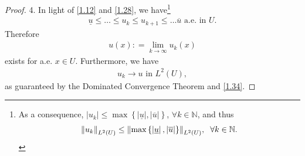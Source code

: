 \documentclass[11pt,a4paper,center,notitlepage]{article}
\numberwithin{equation}{section}
\begin{document}
\begin{proof}
4. In light of \eqref{1.12} and \eqref{1.28}, we have\footnote{As a consequence, $\left| {{u_k}} \right| \le \max \left\{ {\left| {\underline u } \right|,\left| {\overline u } \right|} \right\}$, $\forall k \in \mathbb{N}$, and thus
\begin{align}
{\left\| {{u_k}} \right\|_{{L^2}\left( U \right)}} \le {\left\| {\max \left\{ {\left| {\underline u } \right|,\left| {\overline u } \right|} \right\}} \right\|_{{L^2}\left( U \right)}},\hspace{2mm}\forall k \in \mathbb{N}.
\end{align}}
\begin{align}
\label{1.34}
\underline{u}\le \ldots \le u_k\le u_{k+1} \le \ldots \overline{u} \mbox{ a.e. in } U.
\end{align}
Therefore
\begin{align}
u\left( x \right): = \mathop {\lim }\limits_{k \to \infty } {u_k}\left( x \right)
\end{align}
exists for a.e. $x \in U$. Furthermore, we have
\begin{align}
u_k \to  u \mbox{ in } L^2\left(U\right),
\end{align}
as guaranteed by the Dominated Convergence Theorem and \eqref{1.34}.


\end{proof}
\end{document}
